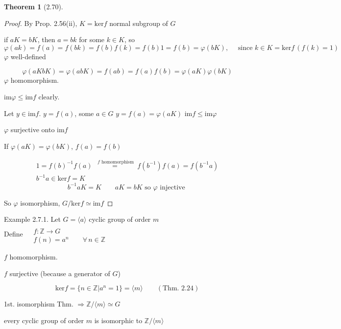 \documentclass[twoside,landscape]{amsart}
\theoremstyle{plain}
\newtheorem{theorem}{Theorem}
\theoremstyle{definition}
\theoremstyle{remark}
\begin{document}
\begin{multicols*}{2}
\begin{theorem}[2.70]
\end{theorem}

\begin{proof} By Prop. 2.56(ii), $K = \text{ker}{f}$ \quad normal subgroup of $G$ 

if $aK = bK$, then $a=bk$ for some $k \in K$, so 
\[
\varphi(ak) = f(a) = f(bk) = f(b) f(k) = f(b) 1 = f(b) = \varphi(bK) , \quad \text{ since } k \in K = \text{ker}{f} \, (f(k) = 1) 
\]
$\varphi$ well-defined 

\[
\varphi(a K bK ) = \varphi(ab K) = f(ab) = f(a) f(b) = \varphi(aK) \varphi(bK) 
\]
$\varphi$ homomorphism.  

$\text{im}{\varphi} \leq \text{im}{f}$ clearly.  

Let $y\in \text{im}{f}$.  $y=f(a)$, some $a\in G$  \quad \quad $y= f(a) = \varphi(aK)$  \quad \quad $\text{im}{f} \leq \text{im}{\varphi}$

$\varphi$ surjective onto $\text{im}{f}$

If $\varphi(aK) = \varphi(bK)$, $f(a) = f(b)$ 

\[
\begin{gathered}
1 = f(b)^{-1} f(a) \overset{\text{ $f$ homomorphism }}{=} f(b^{-1}) f(a) = f(b^{-1} a)  \\
b^{-1} a \in \text{ker}{f} = K
\end{gathered}
\]
\[
b^{-1} a K = K \quad \quad aK = bK \text{ so  $\varphi$ injective }
\]

So $\varphi $ isomorphism, $G/\text{ker}{f} \simeq \text{im}{f}$

\end{proof}

Example 2.7.1. Let $G = \langle a \rangle$ cyclic group of order $m$ \\
Define $\begin{aligned} & \quad \\ 
  & f: \mathbb{Z} \to G \\
  & f(n) = a^n \quad \quad \forall \, n \in \mathbb{Z} \end{aligned}$

$f$ homomorphism.  

$f$ surjective (because a generator of $G$)

\[
\text{ker}{f} = \lbrace n\in \mathbb{Z} | a^n = 1 \rbrace = \langle m \rangle \quad \quad (\text{Thm. 2.24})
\]

1st. isomorphism Thm. $\Longrightarrow \mathbb{Z}/ \langle m \rangle \simeq G$ 

every cyclic group of order $m$ is isomorphic to $\mathbb{Z}/\langle m \rangle$


\end{multicols*}
\end{document}
